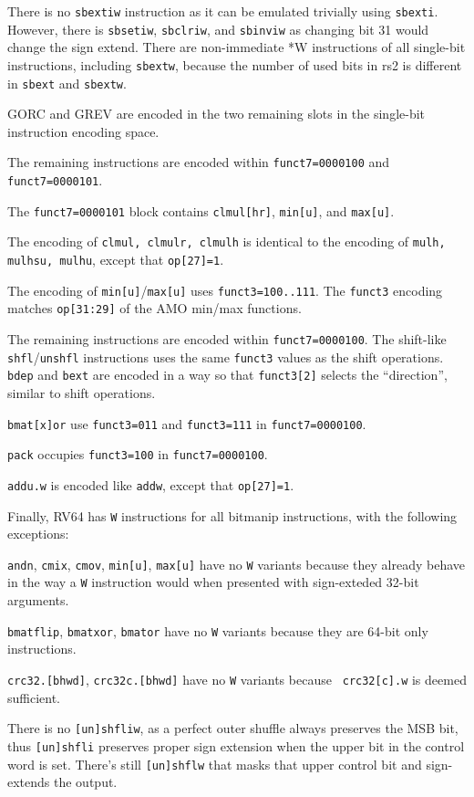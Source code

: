 There is no {\tt sbextiw} instruction as it can be emulated trivially using
{\tt sbexti}. However, there is {\tt sbsetiw}, {\tt sbclriw}, and {\tt sbinviw}
as changing bit 31 would change the sign extend. There are non-immediate *W
instructions of all single-bit instructions, including {\tt sbextw}, because
the number of used bits in rs2 is different in {\tt sbext} and {\tt sbextw}.

GORC and GREV are encoded in the two remaining slots in the single-bit
instruction encoding space.

The remaining instructions are encoded within {\tt funct7=0000100} and
{\tt funct7=0000101}.

The {\tt funct7=0000101} block contains {\tt clmul[hr]},
{\tt min[u]}, and {\tt max[u]}.

The encoding of {\tt clmul, clmulr, clmulh} is identical to the encoding of
{\tt mulh, mulhsu, mulhu}, except that {\tt op[27]=1}.

The encoding of {\tt min[u]}/{\tt max[u]} uses {\tt funct3=100..111}. The
{\tt funct3} encoding matches {\tt op[31:29]} of the AMO min/max functions.

The remaining instructions are encoded within {\tt funct7=0000100}. The
shift-like {\tt shfl}/{\tt unshfl} instructions uses the same {\tt funct3}
values as the shift operations. {\tt bdep} and {\tt bext} are encoded in a
way so that {\tt funct3[2]} selects the ``direction'', similar to shift
operations.

{\tt bmat[x]or} use {\tt funct3=011} and {\tt funct3=111} in {\tt funct7=0000100}.

{\tt pack} occupies {\tt funct3=100} in {\tt funct7=0000100}.

{\tt addu.w} is encoded like {\tt addw}, except that {\tt op[27]=1}.

Finally, RV64 has {\tt *W} instructions for all bitmanip instructions, with the
following exceptions:

{\tt andn}, {\tt cmix}, {\tt cmov}, {\tt min[u]}, {\tt max[u]} have no {\tt *W}
variants because they already behave in the way a {\tt *W} instruction would
when presented with sign-exteded 32-bit arguments.

{\tt bmatflip}, {\tt bmatxor}, {\tt bmator} have no {\tt *W} variants because
they are 64-bit only instructions.

{\tt crc32.[bhwd]}, {\tt crc32c.[bhwd]} have no {\tt *W} variants because {\tt
crc32[c].w} is deemed sufficient.

There is no {\tt [un]shfliw}, as a perfect outer shuffle always preserves the
MSB bit, thus {\tt [un]shfli} preserves proper sign extension when the
upper bit in the control word is set. There's still {\tt [un]shflw} that
masks that upper control bit and sign-extends the output.

